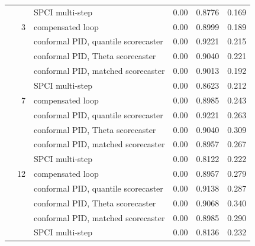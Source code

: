 \begin{tabular}{@{}lrlrrr@{}}
 &  & SPCI multi-step & 0.00 & 0.8776 & 0.169 \\
\addlinespace
 & 3 & compensated loop & 0.00 & 0.8999 & 0.189 \\
 &  & conformal PID, quantile scorecaster & 0.00 & 0.9221 & 0.215 \\
 &  & conformal PID, Theta scorecaster & 0.00 & 0.9040 & 0.221 \\
 &  & conformal PID, matched scorecaster & 0.00 & 0.9013 & 0.192 \\
 &  & SPCI multi-step & 0.00 & 0.8623 & 0.212 \\
\addlinespace
 & 7 & compensated loop & 0.00 & 0.8985 & 0.243 \\
 &  & conformal PID, quantile scorecaster & 0.00 & 0.9221 & 0.263 \\
 &  & conformal PID, Theta scorecaster & 0.00 & 0.9040 & 0.309 \\
 &  & conformal PID, matched scorecaster & 0.00 & 0.8957 & 0.267 \\
 &  & SPCI multi-step & 0.00 & 0.8122 & 0.222 \\
\addlinespace
 & 12 & compensated loop & 0.00 & 0.8957 & 0.279 \\
 &  & conformal PID, quantile scorecaster & 0.00 & 0.9138 & 0.287 \\
 &  & conformal PID, Theta scorecaster & 0.00 & 0.9068 & 0.340 \\
 &  & conformal PID, matched scorecaster & 0.00 & 0.8985 & 0.290 \\
 &  & SPCI multi-step & 0.00 & 0.8136 & 0.232 \\
\bottomrule
\end{tabular}
